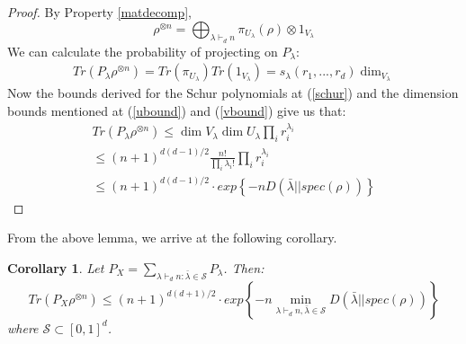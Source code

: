 \documentclass[11pt]{article}%
\newtheorem{coro}{Corollary}
\begin{document}
\begin{proof}
 By Property \ref{matdecomp},
 $$ \rho^{\otimes n} = \bigoplus_{\lambda \vdash_d n} \pi_{U_\lambda}(\rho) \otimes 1_{V_\lambda}$$
 We can calculate the probability of projecting on $P_{\lambda}$:
 \begin{gather*}
   Tr(P_\lambda\rho^{\otimes n}) = Tr(\pi_{U_\lambda})Tr(1_{V_\lambda}) = s_{\lambda}(r_1,...,r_d)\dim_{V_\lambda}
 \end{gather*}
  Now the bounds derived for the Schur polynomials at (\ref{schur}) and the dimension bounds mentioned at (\ref{ubound}) and (\ref{vbound}) give us that:
  \begin{gather*}
    Tr(P_\lambda\rho^{\otimes n}) \leq \dim{V_\lambda}\dim{U_\lambda} \prod_{i} r_i^{\lambda_i} \\
    \leq (n+1)^{d(d-1)/2}\frac{n!}{\prod_i \lambda_i!} \prod_{i} r_i^{\lambda_i} \\
    \leq (n+1)^{d(d-1)/2}\cdot exp\left\{{-n D(\bar{\lambda}||spec(\rho))}\right\}
  \end{gather*}
\end{proof}

\noindent From the above lemma, we arrive at the following corollary.

\begin{coro}
  Let $P_X = \sum_{\lambda \vdash_d n: \bar{\lambda} \in \mathcal{S}} P_\lambda$. Then:
  $$ Tr(P_X\rho^{\otimes n}) \leq (n+1)^{d(d+1)/2} \cdot exp\left\{-n \min_{\lambda \vdash_d n, \bar{\lambda} \in \mathcal{S}}{D(\bar{\lambda}||spec(\rho))} \right\}$$
where $\mathcal{S} \subset [0,1]^d$.
\end{coro}
\end{document}
